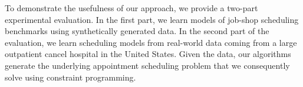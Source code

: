 To demonstrate the usefulness of our approach,
we provide a two-part experimental evaluation.
In the first part, we learn 
models of job-shop scheduling
benchmarks using 
synthetically generated data. In the second part of the evaluation,
we learn scheduling models from real-world data
coming from a large outpatient cancel hospital in the United States. 
Given the data, our algorithms generate
the underlying appointment scheduling problem 
that we consequently solve 
using constraint programming.

 